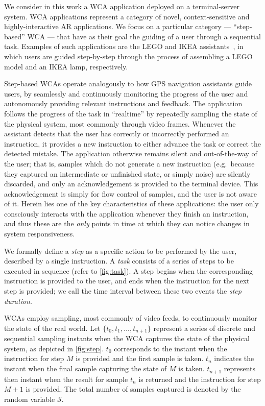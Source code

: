 

We consider in this work a \gls{WCA} application deployed on a terminal-server system.
\gls{WCA} applications represent a category of novel, context-sensitive and highly-interactive \gls{AR} applications.
We focus on a particular category --- ``step-based'' \gls{WCA} --- that have as their goal the guiding of a user through a sequential task.
Examples of such applications are the LEGO and IKEA assistants~\cite{chen2015early,chen2018application}, in which users are guided step-by-step through the process of assembling a LEGO model and an IKEA lamp, respectively.

Step-based \glspl{WCA} operate analogously to how \gls{GPS} navigation assistants guide users, by seamlessly and continuously monitoring the progress of the user and autonomously providing relevant instructions and feedback.
The application follows the progress of the task in ``realtime'' by repeatedly sampling the state of the physical system, most commonly through video frames.
Whenever the assistant detects that the user has correctly or incorrectly performed an instruction, it provides a new instruction to either advance the task or correct the detected mistake.
The application otherwise remains silent and out-of-the-way of the user;
that is, samples which do not generate a new instruction (e.g.~because they captured an intermediate or unfinished state, or simply noise) are silently discarded, and only an acknowledgement is provided to the terminal device.
This acknowledgement is simply for flow control of samples, and the user is not aware of it.
Herein lies one of the key characteristics of these applications: the user only consciously interacts with the application whenever they finish an instruction, and thus these are the \emph{only} points in time at which they can notice changes in system responsiveness.

We formally define a \emph{step} as a specific action to be performed by the user, described by a single instruction. 
A \emph{task} consists of a series of steps to be executed in sequence (refer to \cref{fig:task}).
A step begins when the corresponding instruction is provided to the user, and ends when the instruction for the next step is provided; we call the time interval between these two events the \emph{step duration}.

\glspl{WCA} employ sampling, most commonly of video feeds, to continuously monitor the state of the real world.
Let \( \{ t_0, t_1, \ldots, t_{n + 1} \} \) represent a series of discrete and sequential sampling instants when the \gls{WCA} captures the state of the physical system, as depicted in \cref{fig:step}.
\( t_0 \) corresponds to the instant when the instruction for step \( M \) is provided and the first sample is taken. 
\( t_n \) indicates the instant when the final sample capturing the state of \( M \) is taken. 
\( t_{n + 1} \) represents then instant when the result for sample \( t_n \) is returned and the instruction for step \( M + 1 \) is provided.
The total number of samples captured is denoted by the random variable \ensuremath{\mathcal{S}}.

